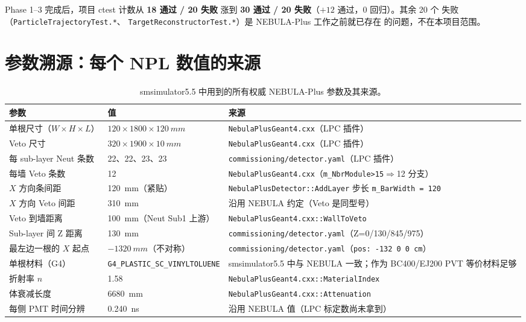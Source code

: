 \documentclass[a4paper,11pt]{ctexart}
\newcommand{\NEB}{NEBULA}
\newcommand{\NPL}{NEBULA-Plus}
\begin{document}
Phase 1--3 完成后，项目 ctest 计数从 \textbf{18 通过 / 20 失败} 涨到
\textbf{30 通过 / 20 失败}（$+12$ 通过，$0$ 回归）。其余 20 个
失败（\texttt{ParticleTrajectoryTest.*}、
\texttt{TargetReconstructorTest.*}）是 \NPL{} 工作之前就已存在
的问题，不在本项目范围。

\section{参数溯源：每个 NPL 数值的来源}
\label{sec:provenance}

\begin{table}[h]
\centering
\caption{smsimulator5.5 中用到的所有权威 \NPL{} 参数及其来源。}
\begin{tabular}{p{4.4cm}lp{6.8cm}}
\toprule
参数 & 值 & 来源\\
\midrule
单根尺寸（$W\times H\times L$）
  & $120\times 1800\times \SI{120}{mm}$
  & \texttt{NebulaPlusGeant4.cxx}（LPC 插件）\\
Veto 尺寸
  & $320\times 1900\times \SI{10}{mm}$
  & \texttt{NebulaPlusGeant4.cxx}（LPC 插件）\\
每 sub-layer Neut 条数
  & 22、22、23、23
  & \texttt{commissioning/detector.yaml}（LPC 插件）\\
每墙 Veto 条数
  & 12
  & \texttt{NebulaPlusGeant4.cxx}（\texttt{m\_NbrModule>15}$\Rightarrow$12 分支）\\
$X$ 方向条间距
  & \SI{120}{mm}（紧贴）
  & \texttt{NebulaPlusDetector::AddLayer} 步长 \texttt{m\_BarWidth = 120}\\
$X$ 方向 Veto 间距
  & \SI{310}{mm}
  & 沿用 \NEB{} 约定（Veto 是同型号）\\
Veto 到墙距离
  & \SI{100}{mm}（Neut Sub1 上游）
  & \texttt{NebulaPlusGeant4.cxx::WallToVeto}\\
Sub-layer 间 Z 距离
  & \SI{130}{mm}
  & \texttt{commissioning/detector.yaml}（Z=0/130/845/975）\\
最左边一根的 $X$ 起点
  & $-\SI{1320}{mm}$（不对称）
  & \texttt{commissioning/detector.yaml}（\texttt{pos: -132 0 0 cm}）\\
单根材料（G4）
  & \texttt{G4\_PLASTIC\_SC\_VINYLTOLUENE}
  & smsimulator5.5 中与 \NEB{} 一致；作为 BC400/EJ200 PVT 等价材料足够\\
折射率 $n$
  & 1.58
  & \texttt{NebulaPlusGeant4.cxx::MaterialIndex}\\
体衰减长度
  & \SI{6680}{mm}
  & \texttt{NebulaPlusGeant4.cxx::Attenuation}\\
每侧 PMT 时间分辨
  & \SI{0.240}{ns}
  & 沿用 \NEB{} 值（LPC 标定数尚未拿到）\\

\end{tabular}
\end{table}
\end{document}
